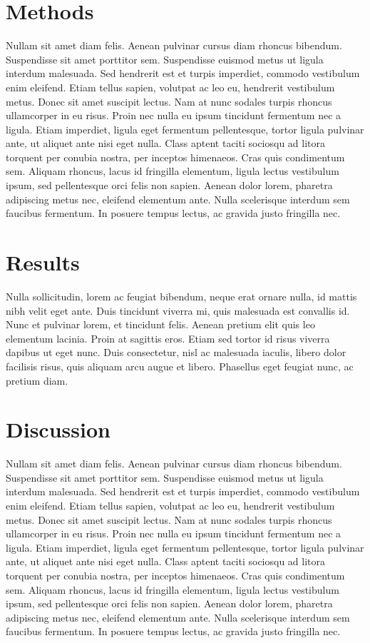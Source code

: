 \section{Methods}
\label{sec:studythree:methods}

Nullam sit amet diam felis. Aenean pulvinar cursus diam rhoncus bibendum.
Suspendisse sit amet porttitor sem.  Suspendisse euismod metus ut ligula
interdum malesuada.  Sed hendrerit est et turpis imperdiet, commodo
vestibulum enim eleifend.  Etiam tellus sapien, volutpat ac leo eu,
hendrerit vestibulum metus.  Donec sit amet suscipit lectus.  Nam at nunc
sodales turpis rhoncus ullamcorper in eu risus.  Proin nec nulla eu ipsum
tincidunt fermentum nec a ligula.  Etiam imperdiet, ligula eget fermentum
pellentesque, tortor ligula pulvinar ante, ut aliquet ante nisi eget nulla. 
Class aptent taciti sociosqu ad litora torquent per conubia nostra, per
inceptos himenaeos.  Cras quis condimentum sem.  Aliquam rhoncus, lacus id
fringilla elementum, ligula lectus vestibulum ipsum, sed pellentesque orci
felis non sapien.  Aenean dolor lorem, pharetra adipiscing metus nec,
eleifend elementum ante.  Nulla scelerisque interdum sem faucibus fermentum. 
In posuere tempus lectus, ac gravida justo fringilla nec.

\section{Results}
\label{sec:studythree:results}

Nulla sollicitudin, lorem ac feugiat bibendum, neque erat ornare nulla, id
mattis nibh velit eget ante.  Duis tincidunt viverra mi, quis malesuada est
convallis id.  Nunc et pulvinar lorem, et tincidunt felis.  Aenean pretium
elit quis leo elementum lacinia.  Proin at sagittis eros.  Etiam sed tortor
id risus viverra dapibus ut eget nunc.  Duis consectetur, nisl ac malesuada
iaculis, libero dolor facilisis risus, quis aliquam arcu augue et libero. 
Phasellus eget feugiat nunc, ac pretium diam.

\section{Discussion}
\label{sec:studythree:discussion}

Nullam sit amet diam felis. Aenean pulvinar cursus diam rhoncus bibendum.
Suspendisse sit amet porttitor sem.  Suspendisse euismod metus ut ligula
interdum malesuada.  Sed hendrerit est et turpis imperdiet, commodo
vestibulum enim eleifend.  Etiam tellus sapien, volutpat ac leo eu,
hendrerit vestibulum metus.  Donec sit amet suscipit lectus.  Nam at nunc
sodales turpis rhoncus ullamcorper in eu risus.  Proin nec nulla eu ipsum
tincidunt fermentum nec a ligula.  Etiam imperdiet, ligula eget fermentum
pellentesque, tortor ligula pulvinar ante, ut aliquet ante nisi eget nulla. 
Class aptent taciti sociosqu ad litora torquent per conubia nostra, per
inceptos himenaeos.  Cras quis condimentum sem.  Aliquam rhoncus, lacus id
fringilla elementum, ligula lectus vestibulum ipsum, sed pellentesque orci
felis non sapien.  Aenean dolor lorem, pharetra adipiscing metus nec,
eleifend elementum ante.  Nulla scelerisque interdum sem faucibus fermentum. 
In posuere tempus lectus, ac gravida justo fringilla nec.

